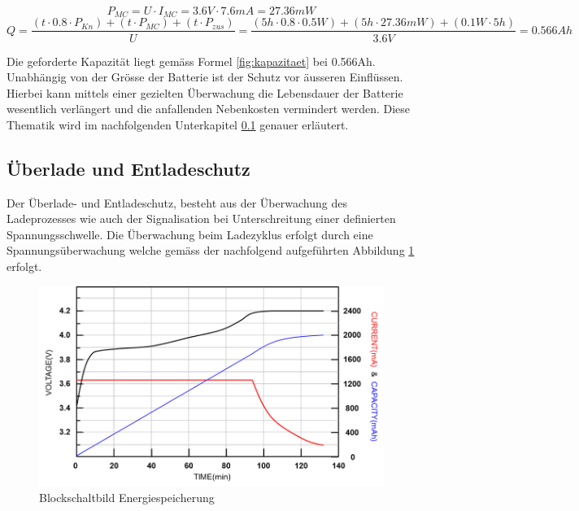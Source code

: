 \begin{equation}
P_{MC}=U\cdot I_{MC}=3.6V\cdot 7.6mA=27.36mW
\label{fig:LeistungMC}
\end{equation}
\begin{equation}
Q=\frac{\left(t\cdot 0.8\cdot P_{Kn}\right)+\left(t\cdot P_{MC}\right)+(t\cdot P_{zus})}{U}=\frac{\left(5h\cdot 0.8\cdot 0.5W\right)+\left(5h\cdot 27.36mW\right)+(0.1W\cdot 5h)}{3.6V}=0.566Ah
\label{fig:kapazitaet}
\end{equation}

Die geforderte Kapazität liegt gemäss Formel \ref{fig:kapazitaet} bei 0.566Ah. Unabhängig von der Grösse der Batterie ist der Schutz vor äusseren Einflüssen. Hierbei kann mittels einer gezielten Überwachung die Lebensdauer der Batterie wesentlich verlängert und die anfallenden Nebenkosten vermindert werden. Diese Thematik wird im nachfolgenden Unterkapitel \ref{Überlade und Entladeschutz} genauer erläutert.
                                         
\subsection{Überlade und Entladeschutz}  \label{Überlade und Entladeschutz}

Der Überlade- und Entladeschutz, besteht aus der Überwachung des Ladeprozesses wie auch der Signalisation bei Unterschreitung einer definierten Spannungsschwelle. Die Überwachung beim Ladezyklus erfolgt durch eine Spannungsüberwachung welche gemäss der nachfolgend aufgeführten Abbildung \ref{fig:Ladekurve Li-Ion Akku} erfolgt.

\begin{figure}[H]
	\begin{center}
		\includegraphics[width=120mm]{data/LadekurveLiIon.png}
		\caption{Blockschaltbild Energiespeicherung} %
		\label{fig:Ladekurve Li-Ion Akku}
	\end{center}
\end{figure}

